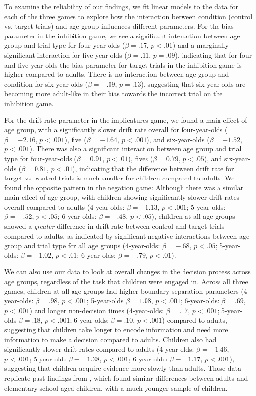 \documentclass[10pt,letterpaper]{article}
\begin{document}
To examine the reliability of our findings, we fit linear models to the data for each of the three games to explore how the interaction between condition (control vs. target trials) and age group influences different parameters.  For the bias parameter in the inhibition game, we see a significant interaction between age group and trial type for four-year-olds ($\beta = .17$, $p< .01$) and a marginally significant interaction for five-year-olds ($\beta = .11$, $p = .09$), indicating that for four and five-year-olds the bias parameter for target trials in the inhibition game is higher compared to adults.  There is no interaction between age group and condition for six-year-olds ($\beta = -.09$, $p = .13$), suggesting that six-year-olds are becoming more adult-like in their bias towards the incorrect trial on the inhibition game.

For the drift rate parameter in the implicatures game, we found a main effect of age group, with a significantly slower drift rate overall for four-year-olds ($\beta = -2.16$, $p < .001$), five ($\beta = -1.64$, $p < .001$), and six-year-olds ($\beta = -1.52$, $p < .001$).  There was also a significant interaction between age group and trial type for four-year-olds ($\beta = 0.91$, $p <.01$), fives ($\beta = 0.79$, $p <.05$), and six-year-olds ($\beta = 0.81$, $p <.01$), indicating that the difference between drift rate for target vs. control trials is much smaller for children compared to adults.  We found the opposite pattern in the negation game: Although there was a similar main effect of age group, with children showing significantly slower drift rates overall compared to adults (4-year-olds: $\beta = -1.13$, $p <.001$; 5-year-olds: $\beta = -.52$, $p <.05$; 6-year-olds: $\beta = -.48$, $p <.05$), children at all age groups showed a \emph{greater} difference in drift rate between control and target trials compared to adults, as indicated by significant negative interactions between age group and trial type for all age groups (4-year-olds: $\beta = -.68$, $p <.05$; 5-year-olds: $\beta = -1.02$, $p <.01$; 6-year-olds: $\beta = -.79$, $p <.01$).  

We can also use our data to look at overall changes in the decision process across age groups, regardless of the task that children were engaged in. Across all three games, children at all age groups had higher boundary separation parameters (4-year-olds: $\beta = .98$, $p <.001$; 5-year-olds $\beta = 1.08$, $p <.001$; 6-year-olds: $\beta = .69$, $p <.001$) and longer non-decision times (4-year-olds: $\beta = .17$, $p <.001$; 5-year-olds $\beta = .18$, $p <.001$; 6-year-olds: $\beta = .10$, $p <.001$) compared to adults, suggesting that children take longer to encode information and need more information to make a decision compared to adults.  Children also had significantly slower drift rates compared to adults (4-year-olds: $\beta = -1.46$, $p <.001$; 5-year-olds $\beta = -1.38$, $p <.001$; 6-year-olds: $\beta = -1.17$, $p <.001$), suggesting that children acquire evidence more slowly than adults.  These data replicate past findings from , which found similar differences between adults and elementary-school aged children, with a much younger sample of children.  
\end{document}
